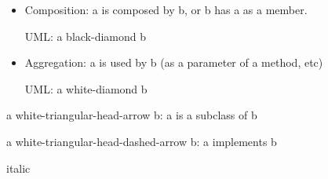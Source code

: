     \begin{itemize}
    \item Composition: a is composed by b, or b has a as a member.
      \par UML: a black-diamond b
    \item Aggregation: a is used by b (as a parameter of a method, etc)
      \par UML: a white-diamond b
    \end{itemize}
    \par a white-triangular-head-arrow b: a is a subclass of b
    \par a white-triangular-head-dashed-arrow b: a implements b
    \par italic
